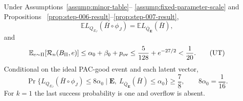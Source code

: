 \begin{proposition}
\label{prop:step-008-result}
Under Assumptions~\ref{assump:minor-table}--
\ref{assump:fixed-parameter-scale} and Propositions~
\ref{prop:step-006-result}--\ref{prop:step-007-result},
\[
\mathbb E L_{Q_{E_J}}(\bar H\circ\phi_J)
=\mathbb E L_{\bar Q_{\mathbf E}}(\bar H),
\tag{EX}\label{eq:exchangeability}
\]
and
\[
\mathbb E_{e\sim\Pi}[\mathcal R_n(B_\Pi,e)]
\leq\alpha_0+\beta_0+p_{\rm ov}
\leq\frac5{128}+e^{-27/2}<\frac1{20}.
\tag{UT}\label{eq:utility}
\]
Conditional on the ideal PAC-good event and each latent vector,
\[
\Pr\{L_{Q_{E_J}}(\bar H\circ\phi_J)\leq8\alpha_0\mid
  \mathbf E,\ L_{\bar Q_{\mathbf E}}(\bar H)\leq\alpha_0\}
\geq\frac78,
\qquad8\alpha_0=\frac1{16}.
\tag{AUX}\label{eq:auxiliary}
\]
For $k=1$ the last success probability is one and overflow is absent.
\end{proposition}
